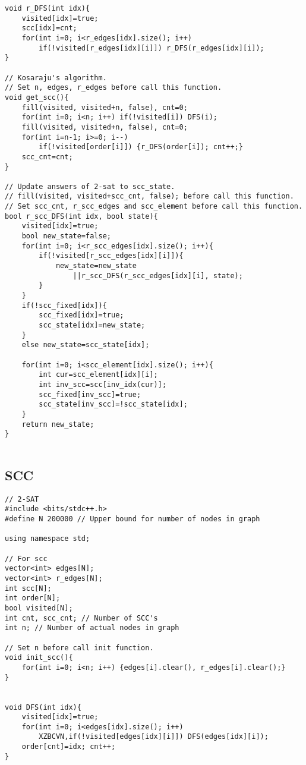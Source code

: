 \documentclass[10pt, landscape]{article}
\begin{document}
\begin{multicols}{2}
\begin{verbatim}
void r_DFS(int idx){
    visited[idx]=true;
    scc[idx]=cnt;
    for(int i=0; i<r_edges[idx].size(); i++) 
        if(!visited[r_edges[idx][i]]) r_DFS(r_edges[idx][i]);
}

// Kosaraju's algorithm. 
// Set n, edges, r_edges before call this function.
void get_scc(){
    fill(visited, visited+n, false), cnt=0;
    for(int i=0; i<n; i++) if(!visited[i]) DFS(i);
    fill(visited, visited+n, false), cnt=0;
    for(int i=n-1; i>=0; i--) 
        if(!visited[order[i]]) {r_DFS(order[i]); cnt++;}
    scc_cnt=cnt;
}

// Update answers of 2-sat to scc_state. 
// fill(visited, visited+scc_cnt, false); before call this function.
// Set scc_cnt, r_scc_edges and scc_element before call this function.
bool r_scc_DFS(int idx, bool state){
    visited[idx]=true;
    bool new_state=false;
    for(int i=0; i<r_scc_edges[idx].size(); i++){
        if(!visited[r_scc_edges[idx][i]]){
            new_state=new_state
                ||r_scc_DFS(r_scc_edges[idx][i], state);
        }
    }
    if(!scc_fixed[idx]){
        scc_fixed[idx]=true;
        scc_state[idx]=new_state;
    }
    else new_state=scc_state[idx];

    for(int i=0; i<scc_element[idx].size(); i++){
        int cur=scc_element[idx][i];
        int inv_scc=scc[inv_idx(cur)];
        scc_fixed[inv_scc]=true;
        scc_state[inv_scc]=!scc_state[idx];
    }
    return new_state;
}


\end{verbatim}

\subsection{SCC}
\begin{verbatim}
// 2-SAT
#include <bits/stdc++.h>
#define N 200000 // Upper bound for number of nodes in graph

using namespace std;

// For scc
vector<int> edges[N]; 
vector<int> r_edges[N];
int scc[N];
int order[N];
bool visited[N];
int cnt, scc_cnt; // Number of SCC's
int n; // Number of actual nodes in graph

// Set n before call init function.
void init_scc(){
    for(int i=0; i<n; i++) {edges[i].clear(), r_edges[i].clear();}
}


void DFS(int idx){
    visited[idx]=true;
    for(int i=0; i<edges[idx].size(); i++) 
        XZBCVN,if(!visited[edges[idx][i]]) DFS(edges[idx][i]);
    order[cnt]=idx; cnt++;
}


\end{verbatim}
\end{multicols}
\end{document}
